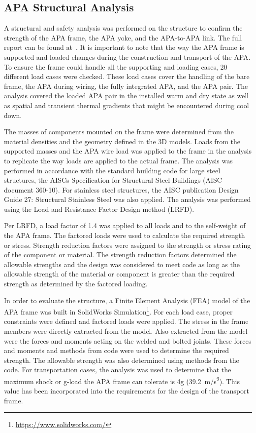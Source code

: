 \subsection{APA Structural Analysis}

A structural and safety analysis was performed on the  structure to confirm the strength of the APA frame, the APA yoke, and the APA-to-APA link.  The full report can be found at~\cite{bib:cernedms2100877}. %
It is important to note that the way the APA frame is supported and loaded changes during the construction and transport of the APA.  To ensure the frame could handle all the supporting and loading cases, 20 different load cases were checked.  These load cases cover the handling of the bare frame, the APA during wiring, the fully integrated APA, and the APA pair.  The analysis covered the loaded APA pair in the installed warm and dry state as well as spatial and transient thermal gradients that might be encountered during cool down.

The masses of components mounted on the frame were determined from the material densities and the geometry defined in the 3D models.  Loads from the supported masses and the APA wire load was applied to the frame in the analysis to replicate the way loads are applied to the actual frame.  The analysis was performed in accordance with the standard building code for large steel structures, the AISCs Specification for Structural Steel Buildings (AISC document 360-10). For stainless steel structures, the AISC publication Design Guide 27: Structural Stainless Steel was also applied.  The analysis was performed using the Load and Resistance Factor Design method (LRFD).

Per LRFD, a load factor of 1.4 was applied to all loads and to the self-weight of the APA frame.  The factored loads were used to calculate the required strength or stress.  Strength reduction factors were assigned to the strength or stress rating of the component or material.  The strength reduction factors determined the allowable strengths and the design was considered to meet code as long as the allowable strength of the material or component is greater than the required strength as determined by the factored loading.

In order to evaluate the structure, a Finite Element Analysis (FEA) model of the APA frame was built in SolidWorks Simulation\footnote{\url{https://www.solidworks.com/}}.   For each load case, proper constraints were defined and factored loads were applied.  The stress in the frame members were directly extracted from the model.  Also extracted from the model were the forces and moments acting on the welded and bolted joints. These forces and moments and methods from code were used to determine the required strength.  The allowable strength was also determined using methods from the code.
For transportation cases, the analysis was used to determine that the maximum shock or g-load the APA frame can tolerate is 4g (\SI{39.2}{m/s^2}).  This value has been incorporated into the requirements for the design of the transport frame.

